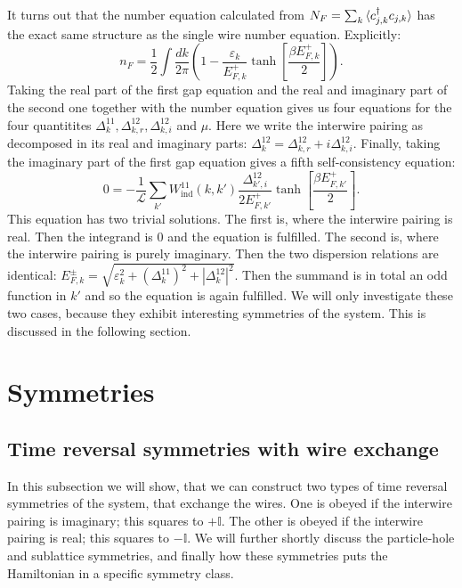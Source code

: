 It turns out that the number equation calculated from $N_F = \sum_k \braket{c^\dagger_{j,k}c_{j,k}}$ has the exact same structure as the single wire number equation. Explicitly: 
\begin{equation}
n_F = \frac{1}{2}\int \frac{dk}{2\pi} \left( 1 - \frac{\varepsilon_k}{E^{+}_{F,k}}\tanh\left[\frac{\beta E^{+}_{F,k}}{2}\right] \right). 
\label{eq.2wiresnumberequation}
\end{equation}
Taking the real part of the first gap equation and the real and imaginary part of the second one together with the number equation gives us four equations for the four quantitites $\Delta^{11}_k, \Delta^{12}_{k,r}, \Delta^{12}_{k,i} $ and $\mu$. Here we write the interwire pairing as decomposed in its real and imaginary parts: $\Delta^{12}_k = \Delta^{12}_{k,r} + i\Delta^{12}_{k,i}$. Finally, taking the imaginary part of the first gap equation gives a fifth self-consistency equation:
\begin{equation}
0 = -\frac{1}{\mathcal{L}}\sum_{k'} W_{\text{ind}}^{11}(k, k')\frac{\Delta^{12}_{k',i}}{2E^{+}_{F,k'}}\tanh\left[\frac{\beta E^{+}_{F,k'}}{2}\right].
\end{equation}
This equation has two trivial solutions. The first is, where the interwire pairing is real. Then the integrand is 0 and the equation is fulfilled. The second is, where the interwire pairing is purely imaginary. Then the two dispersion relations are identical: $E^{\pm}_{F,k} = \sqrt{\varepsilon_k^2 + (\Delta^{11}_k)^2 + |\Delta^{12}_k|^2}$. Then the summand is in total an odd function in $k'$ and so the equation is again fulfilled. We will only investigate these two cases, because they exhibit interesting symmetries of the system. This is discussed in the following section.

\section{Symmetries}
\label{sec.2wiressymmetries}
\subsection{Time reversal symmetries with wire exchange}
\label{subsec.TRwireexchange}
In this subsection we will show, that we can construct two types of time reversal symmetries of the system, that exchange the wires. One is obeyed if the interwire pairing is imaginary; this squares to $+\mathbb{I}$. The other is obeyed if the interwire pairing is real; this squares to $-\mathbb{I}$. We will further shortly discuss the particle-hole and sublattice symmetries, and finally how these symmetries puts the Hamiltonian in a specific symmetry class. 

